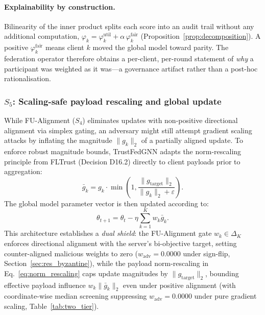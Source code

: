 \documentclass[preprint,12pt]{elsarticle}
\theoremstyle{plain}
\theoremstyle{definition}
\theoremstyle{remark}
\begin{document}
\paragraph{Explainability by construction.} Bilinearity of the inner product splits each score into an audit trail without any additional computation, $\varphi_k = \varphi_k^{\mathrm{util}} + \alpha\,\varphi_k^{\mathrm{fair}}$ (Proposition~\ref{prop:decomposition}). A positive $\varphi_k^{\mathrm{fair}}$ means client $k$ moved the global model toward parity. The federation operator therefore obtains a per-client, per-round statement of \emph{why} a participant was weighted as it was---a governance artifact rather than a post-hoc rationalisation.

\subsubsection{\texorpdfstring{$S_5$:}{S5:} Scaling-safe payload rescaling and global update}
\label{sec:s5_update}
While FU-Alignment ($S_4$) eliminates updates with non-positive directional alignment via simplex gating, an adversary might still attempt gradient scaling attacks by inflating the magnitude $\lVert g_k\rVert_2$ of a partially aligned update. To enforce robust magnitude bounds, TrustFedGNN adapts the norm-rescaling principle from FLTrust \cite{cao2021fltrust} (Decision D16.2) directly to client payloads prior to aggregation:
\begin{equation}
\bar{g}_k = g_k \cdot \min\!\left(1, \frac{\lVert g_{\mathrm{target}}\rVert_2}{\lVert g_k\rVert_2 + \varepsilon}\right) .
\label{eq:norm_rescaling}
\end{equation}
The global model parameter vector is then updated according to:
\begin{equation}
\theta_{t+1} = \theta_t - \eta \sum_{k=1}^K w_k \bar{g}_k .
\label{eq:global_update}
\end{equation}
This architecture establishes a \emph{dual shield}: the FU-Alignment gate $w_k \in \Delta_K$ enforces directional alignment with the server's bi-objective target, setting counter-aligned malicious weights to zero ($w_{\mathrm{adv}} = 0.0000$ under sign-flip, Section~\ref{sec:res_byzantine}), while the payload norm-rescaling in Eq.~\eqref{eq:norm_rescaling} caps update magnitudes by $\lVert g_{\mathrm{target}}\rVert_2$, bounding effective payload influence $w_k \lVert\bar{g}_k\rVert_2$ even under positive alignment (with coordinate-wise median screening suppressing $w_{\mathrm{adv}} = 0.0000$ under pure gradient scaling, Table~\ref{tab:two_tier}).
\end{document}
